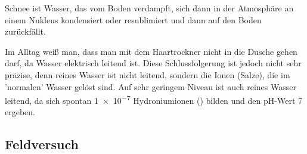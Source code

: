 Schnee ist Wasser, das vom Boden verdampft, sich dann in der Atmosphäre an einem Nukleus kondensiert oder resublimiert und dann auf den Boden zurückfällt.

Im Alltag weiß man, dass man mit dem Haartrockner nicht in die Dusche gehen darf, da Wasser elektrisch leitend ist. Diese Schlussfolgerung ist jedoch nicht sehr präzise, denn reines Wasser ist nicht leitend, sondern die Ionen (Salze), die im 'normalen' Wasser gelöst sind. Auf sehr geringem Niveau ist auch reines Wasser leitend, da sich spontan \SI{1e-7}{\molar} Hydroniumionen () bilden und den pH-Wert 7 ergeben.


\subsection{Feldversuch}

\fi
